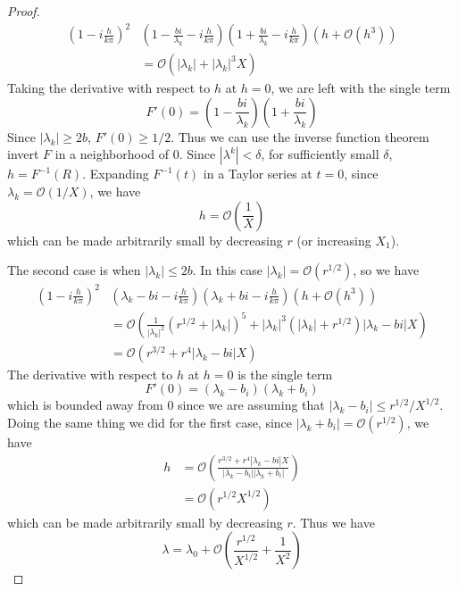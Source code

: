 \documentclass[thesis.tex]{subfiles}
\begin{document}
\begin{lemma}
\begin{proof}
\begin{align*}
\left(1 - i \frac{h}{k \pi} \right)^2 &\left(1 - \frac{b i}{\lambda_k} - i \frac{h}{k \pi} \right)\left(1 + \frac{b i}{\lambda_k} - i \frac{h}{k \pi} \right) ( h + \mathcal{O}(h^3)) \\
&= \mathcal{O}\left(  |\lambda_k|  + |\lambda_k|^3 X \right)
\end{align*}
Taking the derivative with respect to $h$ at $h = 0$, we are left with the single term
\[
F'(0) = \left(1 - \frac{b i}{\lambda_k}\right)\left(1 + \frac{b i}{\lambda_k}\right)
\]
Since $|\lambda_k| \geq 2b$, $F'(0) \geq 1/2$. Thus we can use the inverse function theorem invert $F$ in a neighborhood of 0. Since $|\lambda^k| < \delta$, for sufficiently small $\delta$, $h = F^{-1}(R)$. Expanding $F^{-1}(t)$ in a Taylor series at $t = 0$, since $\lambda_k = \mathcal{O}(1/X)$, we have
\[
h = \mathcal{O}\left( \frac{1}{X} \right)
\]
which can be made arbitrarily small by decreasing $r$ (or increasing $X_1$).

The second case is when $|\lambda_k| \leq 2 b$. In this case $|\lambda_k| = \mathcal{O}(r^{1/2})$, so we have
\begin{align*}
\left(1 - i \frac{h}{k \pi} \right)^2 &\left(\lambda_k - b i - i \frac{h}{k \pi} \right)\left(\lambda_k + b i - i \frac{h}{k \pi} \right) ( h + \mathcal{O}(h^3)) \\
&= \mathcal{O}\left( \frac{1}{|\lambda_k|^2} (r^{1/2} + |\lambda_k|)^5 + |\lambda_k|^3 (|\lambda_k| + r^{1/2})|\lambda_k - b i|X \right) \\
&= \mathcal{O}\left( r^{3/2} + r^4 |\lambda_k - b i|X \right)
\end{align*}
The derivative with respect to $h$ at $h = 0$ is the single term
\[
F'(0) = \left(\lambda_k -  b_i \right)\left(\lambda_k +  b_i \right)
\]
which is bounded away from 0 since we are assuming that $|\lambda_k - b_i| \leq r^{1/2}/X^{1/2}$. Doing the same thing we did for the first case, since $|\lambda_k + b_i| = \mathcal{O}(r^{1/2})$, we have
\begin{align*}
h &= \mathcal{O}\left( \frac{ r^{3/2} + r^4 |\lambda_k - b i|X }{|\lambda_k -  b_i ||\lambda_k +  b_i |} \right) \\
&= \mathcal{O}(r^{1/2}X^{1/2})
\end{align*}
which can be made arbitrarily small by decreasing $r$. Thus we have
\[
\lambda = \lambda_0 + \mathcal{O}\left( \frac{r^{1/2}}{X^{1/2}} + \frac{1}{X^2} \right)
\]
\end{proof}
\end{lemma}
\end{document}
